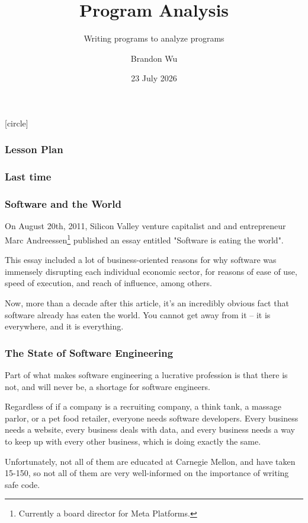 \documentclass[aspectratio=169, handout]{beamer}
\title{Program Analysis} %
\subtitle{Writing programs to analyze programs} %
\date{23 July 2026} %
\author{Brandon Wu} %
\newif\ifcolorlambda
\begin{document}
\ifweb
    \renewcommand{\pause}{}
\fi

[circle]

{
\begin{frame}[plain]
    \colorlambdatrue
    \titlepage
\end{frame}
}

\begin{frame}[fragile]
  \frametitle{Lesson Plan}

  \tableofcontents
\end{frame}

\begin{frame}[fragile]
  \frametitle{Last time}
\end{frame}


\begin{frame}[fragile]
  \frametitle{Software and the World}

  On August 20th, 2011, Silicon Valley venture capitalist and and
  entrepreneur Marc Andreessen\footnote{Currently a board director for Meta Platforms.} published an essay entitled
  "Software is eating the world".

  \pause
  \vspace{\fill}

  This essay included a lot of business-oriented reasons for why software
  was immensely disrupting each individual economic sector, for reasons of
  ease of use, speed of execution, and reach of influence, among others.

  \pause
  \vspace{\fill}

  Now, more than a decade after this article, it's an incredibly obvious fact that
  software already has eaten the world. You cannot get away from it -- it is
  everywhere, and it is everything.
\end{frame}

\begin{frame}[fragile]
  \frametitle{The State of Software Engineering}

  Part of what makes software engineering a lucrative profession is that there
  is not, and will never be, a shortage for software engineers.

  \pause
  \vspace{\fill}

  Regardless of if a company is a recruiting company, a think tank, a massage parlor,
  or a pet food retailer, everyone needs software developers. Every business needs
  a website, every business deals with data, and every business needs a way to
  keep up with every other business, which is doing exactly the same.

  \pause
  \vspace{\fill}

  Unfortunately, not all of them are educated at Carnegie Mellon, and
  have taken 15-150, so not all of them are very well-informed on the
  importance of writing safe code.
\end{frame}
\end{document}
